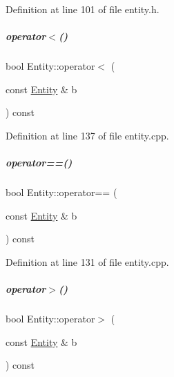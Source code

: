 Definition at line 101 of file entity.\+h.

\mbox{\label{group__icubclient__representations_a84aba0d6b8447437f8bb042daf383957}} 
\subparagraph{\texorpdfstring{operator$<$()}{operator<()}}
{\footnotesize\ttfamily bool Entity\+::operator$<$ (\begin{DoxyParamCaption}\item[{const \hyperlink{group__icubclient__representations_classicubclient_1_1Entity}{Entity} \&}]{b }\end{DoxyParamCaption}) const}



Definition at line 137 of file entity.\+cpp.

\mbox{\label{group__icubclient__representations_a9a600b75d689669bd3c23995f438d002}} 
\subparagraph{\texorpdfstring{operator==()}{operator==()}}
{\footnotesize\ttfamily bool Entity\+::operator== (\begin{DoxyParamCaption}\item[{const \hyperlink{group__icubclient__representations_classicubclient_1_1Entity}{Entity} \&}]{b }\end{DoxyParamCaption}) const}



Definition at line 131 of file entity.\+cpp.

\mbox{\label{group__icubclient__representations_a2425ca69ea9fa4d2b31cc78c88d0c755}} 
\subparagraph{\texorpdfstring{operator$>$()}{operator>()}}
{\footnotesize\ttfamily bool Entity\+::operator$>$ (\begin{DoxyParamCaption}\item[{const \hyperlink{group__icubclient__representations_classicubclient_1_1Entity}{Entity} \&}]{b }\end{DoxyParamCaption}) const}



